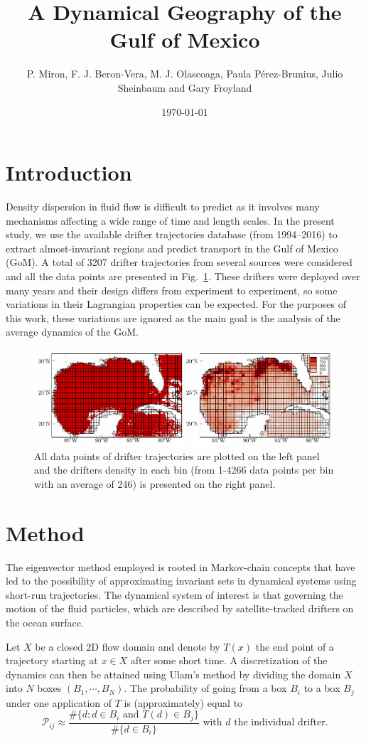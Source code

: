 \documentclass[final]{beamer}
\title
[Gulf of Mexico Oil Spill \& Ecosystem Science Conference, February 5--10 2017,
New Orleans, USA] %
{ %
A Dynamical Geography of the Gulf of Mexico
}
\author{ %
P. Miron\inst{1}, %
F. J. Beron-Vera\inst{1},
M. J. Olascoaga\inst{1},
 Paula P\'erez-Brunius\inst{2}, 
 Julio Sheinbaum\inst{2} and 
 Gary Froyland\inst{3}
}
\institute
[Very Large University] %
{
\inst{1} Rosenstiel School of Marine and Atmospheric Science, University of
Miami, USA
\\[0.3ex]
\inst{2} CICESE, Ensenada, Mexico
\\[0.3ex]
\inst{3} University of New South Wales, Sydney, Australia
}
\date{\today}
\newcommand{\PF}{\mathcal{P}}
\newcommand{\gom}{GoM}
\begin{document}
\begin{frame}[t]
\begin{multicols}{3}

\section{Introduction}
Density dispersion in fluid flow is difficult to predict as it involves many
mechanisms affecting a wide range of time and length scales. In the present
study, we use the available drifter trajectories database (from 1994--2016) to
extract almost-invariant regions and predict transport in the Gulf of Mexico
(\gom). A total of 3207 drifter trajectories from several sources were
considered and all the data points are presented in Fig.~\ref{fig:gom}. These
drifters were deployed over many years and their design differs from experiment
to experiment, so some variations in their Lagrangian properties can be
expected.  For the purposes of this work, these variations are ignored as the
main goal is the analysis of the average dynamics of the \gom.
\begin{figure}
\centering
\includegraphics[width=0.9\columnwidth]{figures/fig03}
\caption{All data points of drifter trajectories are plotted on the left panel
and the drifters density in each bin (from 1-4266 data points per bin with an
average of 246) is presented on the right panel.}
\label{fig:gom}
\end{figure}

\section{Method}
The eigenvector method\citep{froyland2014well} employed is rooted in
Markov-chain concepts that have led to the possibility of approximating
invariant sets in dynamical systems using short-run
trajectories\citep{dellnitz1997almost}. The dynamical system of interest is
that governing the motion of the fluid particles, which are described by
satellite-tracked drifters on the ocean surface.

Let $X$ be a closed 2D flow domain and denote by $T(x)$ the end point of a
trajectory starting at $x \in X$ after some short time. A discretization of the
dynamics can then be attained using Ulam's method\citep{ulam1960,Froyland-01}
by dividing the domain $X$ into $N$ boxes $\left(B_1,\cdots,B_N\right)$. The
probability of going from a box  $B_i$ to a box $B_j$ under one application of
$T$ is (approximately) equal to
\begin{equation*}
\PF_{ij} \approx \frac{\#\lbrace d: d \in B_i \text{ and } T(d) \in
B_j\rbrace}{\#\lbrace d \in B_i\rbrace} \text{ with } d \text{ the individual
drifter.}
\end{equation*}


\end{multicols}
\end{frame}
\end{document}
